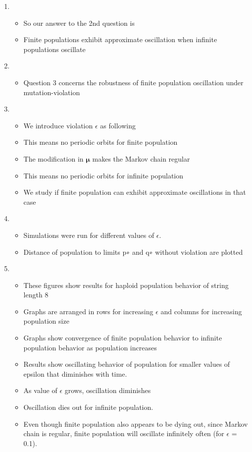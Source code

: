 \documentclass{article}
\begin{document}
\begin{enumerate}
\item
  \begin{itemize}
  \item So our answer to the 2nd question is
   \item Finite populations exhibit approximate oscillation when
     infinite populations oscillate
  \end{itemize}
  
\item
  \begin{itemize}
  \item Question 3 concerns the robustness of finite population oscillation under mutation-violation
  
  \end{itemize}

\item
  \begin{itemize}
  \item We introduce violation $\epsilon$ as following
  \item This means no periodic orbits for finite population
  \item The modification in $\bm{\mu}$ makes the Markov chain regular
  \item This means no periodic orbits for infinite population
  \item We study if finite population can exhibit approximate oscillations in that case 
  \end{itemize}
  
\item
  \begin{itemize}
  \item Simulations were run for different values of $\epsilon$.
  \item Distance of population to limits p∗ and q∗ without violation are plotted  
  \end{itemize}
  
\item
  \begin{itemize}
  \item These figures show results for haploid population behavior of string length 8
  \item Graphs are arranged in rows for increasing $\epsilon$ and columns for increasing population size
  \item Graphs show convergence of finite population behavior to infinite population behavior as population increases
  \item Results show oscillating behavior of population for smaller values of epsilon that diminishes with time.
  \item As value of $\epsilon$ grows, oscillation diminishes
  \item Oscillation dies out for infinite population.
  \item Even though finite population also appears to be dying out, since Markov chain is regular, 
  finite population will oscillate infinitely often (for $\epsilon$ = 0.1).    
  \end{itemize}
  

\end{enumerate}
\end{document}

